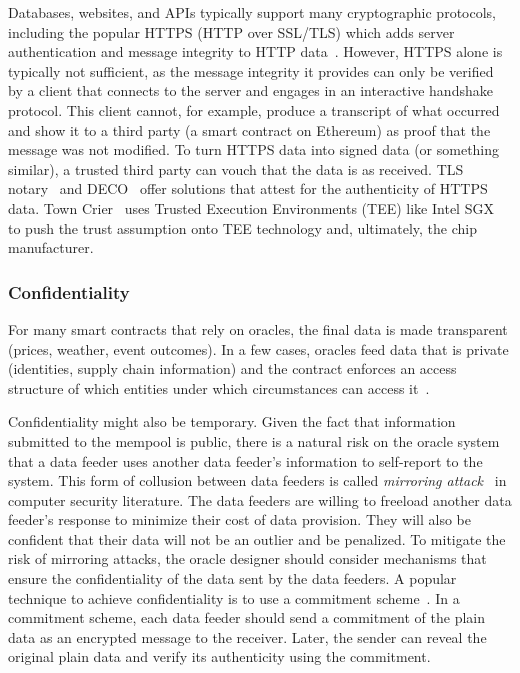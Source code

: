 Databases, websites, and APIs typically support many cryptographic protocols, including the popular HTTPS (HTTP over SSL/TLS) which adds server authentication and message integrity to HTTP data~\cite{clark2013sok}. However, HTTPS alone is typically not sufficient, as the message integrity it provides can only be verified by a client that connects to the server and engages in an interactive handshake protocol. This client cannot, for example, produce a transcript of what occurred and show it to a third party (\eg a smart contract on Ethereum) as proof that the message was not modified. To turn HTTPS data into signed data (or something similar), a trusted third party can vouch that the data is as received. TLS notary~\cite{tlsnotary} and DECO~\cite{zhang2019deco} offer solutions that attest for the authenticity of HTTPS data. Town Crier~\cite{zhang2016town} uses Trusted Execution Environments (TEE) like Intel SGX~\cite{costan2016intel} to push the trust assumption onto TEE technology and, ultimately, the chip manufacturer.

\subsubsection{Confidentiality}


For many smart contracts that rely on oracles, the final data is made transparent (\eg prices, weather, event outcomes). In a few cases, oracles feed data that is private (\eg identities, supply chain information) and the contract enforces an access structure of which entities under which circumstances can access it~\cite{maram2021candid}.

Confidentiality might also be temporary.  Given the fact that information submitted to the mempool is public, there is a natural risk on the oracle system that a data feeder uses another data feeder's information to self-report to the system. This form of collusion between data feeders is called \textit{mirroring attack~\cite{ellis2017chainlink}} in computer security literature. The data feeders are willing to freeload another data feeder's response to minimize their cost of data provision. They will also be confident that their data will not be an outlier and be penalized. To mitigate the risk of mirroring attacks, the oracle designer should consider mechanisms that ensure the confidentiality of the data sent by the data feeders. A popular technique to achieve confidentiality is to use a commitment scheme~\cite{brassard1988minimum}. In a commitment scheme, each data feeder should send a commitment of the plain data as an encrypted message to the receiver. Later, the sender can reveal the original plain data and verify its authenticity using the commitment.


